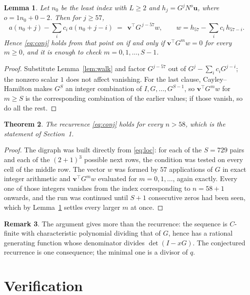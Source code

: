 \documentclass[11pt,a4paper]{article}
\theoremstyle{plain}
\newtheorem{theorem}{Theorem}
\newtheorem{lemma}[theorem]{Lemma}
\theoremstyle{definition}
\newtheorem{remark}[theorem]{Remark}
\begin{document}
\begin{lemma}\label{lem:crit}
Let $n_0$ be the least index with $L\ge2$ and $h_j=G^{j}N^{o}\mathbf{u}$, where
$o=1n_0+0-2$. Then for $j\ge57$,
\[
a(n_0+j)-\sum_i c_i\,a(n_0+j-i)\;=\;\,\mathbf{v}^{\!\top}G^{\,j-57}w,
\qquad w=h_{57}-\sum_i c_i\,h_{57-i} .
\]
Hence \eqref{eq:conj} holds from that point on if and only if
$\mathbf{v}^{\!\top}G^{m}w=0$ for every $m\ge0$, and it is enough to check
$m=0,1,\dots,S-1$.
\end{lemma}

\begin{proof}
Substitute Lemma~\ref{lem:walk} and factor $G^{j-57}$ out of
$G^{j}-\sum_ic_iG^{j-i}$; the nonzero scalar $1$ does not affect
vanishing. For the last clause, Cayley--Hamilton makes $G^{S}$ an integer combination of
$I,G,\dots,G^{S-1}$, so $\mathbf{v}^{\!\top}G^{m}w$ for $m\ge S$ is the corresponding
combination of the earlier values; if those vanish, so do all the rest.
\end{proof}

\begin{theorem}
The recurrence \eqref{eq:conj} holds for every $n>58$, which is the statement of
Section~1.
\end{theorem}

\begin{proof}
The digraph was built directly from \eqref{eq:loc}: for each of the $S=729$ pairs and each
of the $(2+1)^{3}$ possible next rows, the condition was tested on every cell of
the middle row. The vector $w$ was formed by $57$ applications of $G$ in exact integer
arithmetic and $\mathbf{v}^{\!\top}G^{m}w$ evaluated for $m=0,1,\dots$, again exactly.
Every one of those integers vanishes from the index corresponding to $n=58+1$ onwards,
and the run was continued until $S+1$ consecutive zeros had been seen, which by
Lemma~\ref{lem:crit} settles every larger $m$ at once.
\end{proof}

\begin{remark}
The argument gives more than the recurrence: the sequence is $C$-finite with characteristic
polynomial dividing that of $G$, hence has a rational generating function whose denominator
divides $\det(I-xG)$. The conjectured recurrence is one consequence; the minimal one is a
divisor of $q$.
\end{remark}

\section{Verification}
\end{document}
